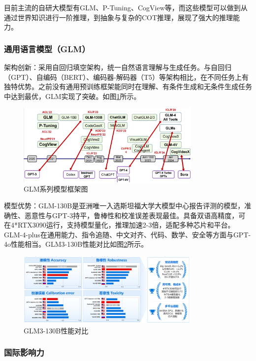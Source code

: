 目前主流的自研大模型有GLM、P-Tuning、CogView等，而这些模型可以做到从通过世界知识进行一阶推理，到抽象与复杂的COT推理，展现了强大的推理能力。

\subsubsection{通用语言模型（GLM）}

架构创新：采用自回归填空架构，统一自然语言理解与生成任务。与自回归（GPT）、自编码（BERT）、编码器-解码器（T5）等架构相比，在不同任务上有独特优势。之前没有通用预训练框架能同时在理解、有条件生成和无条件生成任务中达到最优，GLM实现了突破。如图\ref{fig:glm}所示。

\begin{figure}[H]
	\centering
	\includegraphics[width=0.8\textwidth]{figures/chapter1/fig11.png}
	\caption{GLM系列模型框架图}
	\label{fig:glm}
\end{figure}

模型优势：GLM-130B是亚洲唯一入选斯坦福大学大模型中心报告评测的模型，准确性、恶意性与GPT-3持平，鲁棒性和校准误差表现最佳。具备双语高精度，可在4*RTX3090运行，支持模型量化，推理加速2-3倍，适配多种芯片和平台。GLM-4-plus在通用能力、指令追随、中文对齐、代码、数学、安全等方面与GPT-4o性能相当。GLM3-130B性能对比如图\ref{fig:glm3130b}所示。

\begin{figure}[H]
	\centering
	\includegraphics[width=0.8\textwidth]{figures/chapter1/fig12.png}
	\caption{GLM3-130B性能对比}
	\label{fig:glm3130b}
\end{figure}

\subsubsection{国际影响力}

